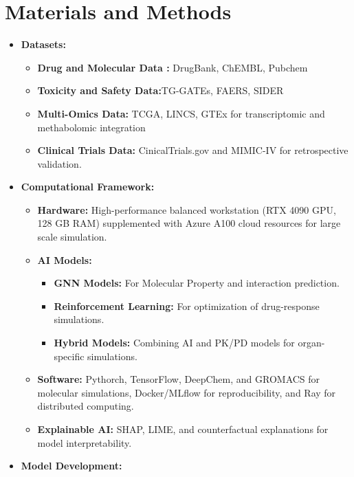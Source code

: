 \chapter*{Materials and Methods}

\begin{itemize}
    \item \textbf{Datasets:}
    \begin{itemize}
        \item \textbf{Drug and Molecular Data :} DrugBank, ChEMBL, Pubchem
        \item \textbf{Toxicity and Safety Data:}TG-GATEs, FAERS, SIDER
        \item \textbf{Multi-Omics Data:} TCGA, LINCS, GTEx for transcriptomic and methabolomic integration
        \item \textbf{Clinical Trials Data:} CinicalTrials.gov and MIMIC-IV for retrospective validation.
    \end{itemize}
    \item \textbf{Computational Framework:}
        \begin{itemize}
            \item \textbf{Hardware:} High-performance balanced workstation (RTX 4090 GPU, 128 GB RAM) supplemented with Azure A100 cloud resources for large scale simulation.
            \item \textbf{AI Models:} 
            \begin{itemize}
                \item \textbf{GNN Models:} For Molecular Property and interaction prediction.
                \item \textbf{Reinforcement Learning:} For optimization of drug-response simulations.
                \item \textbf{Hybrid Models:} Combining AI and PK/PD models for organ-specific simulations.
            \end{itemize}
            \item \textbf{Software:} Pythorch, TensorFlow, DeepChem, and GROMACS for molecular simulations, Docker/MLflow for reproducibility, and Ray for distributed computing.
            \item \textbf{Explainable AI:} SHAP, LIME, and counterfactual explanations for model interpretability.
        \end{itemize}
    \item \textbf{Model Development:}
    \begin{itemize}

\end{itemize}
\end{itemize}
